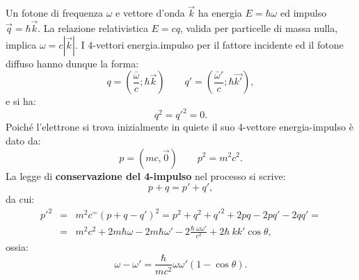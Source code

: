 \documentclass[a4paper,12pt,oneside]{book}
\begin{document}
Un fotone di frequenza $\omega$ e vettore d'onda $\vec{k}$ ha energia $E = \hbar \omega$ ed impulso $\vec{q}= \hbar \vec{k}$. La relazione relativistica $E=cq$, valida per particelle di massa nulla, implica $\omega = c|\vec{k}|$. I 4-vettori energia.impulso per il fattore incidente ed il fotone diffuso hanno dunque la forma:
\begin{equation}
q=\left(\frac{\bar \omega}{c}; \hbar \vec{k} \right)\qquad q' = \left(\frac{\bar \omega'}{c}; \hbar \vec{k'} \right),
\end{equation}
e si ha:
\begin{equation}
q^2 = q'^2=0.
\end{equation}
Poiché l'elettrone si trova inizialmente in quiete il suo 4-vettore energia-impulso è dato da:
\begin{equation}
p=\left(mc, \vec{0} \right)\qquad p^2 =m^2 c^2.
\end{equation}
La legge di \textbf{conservazione del 4-impulso} nel processo si scrive:
\begin{equation}
p+q=p'+q',
\end{equation}
da cui:
\begin{eqnarray}
p'^2 &=& m^2 c^ = \left( p +q -q'\right)^2= p^2 + q^2 +q'^2+ 2pq - 2pq' -2 qq'= \nonumber \\
&=& m^2c^2 + 2m\hbar \omega - 2m \hbar \omega ' - 2 \frac{\hbar \ \omega \omega '}{c^2}+2 \hbar \ k k'  \cos \theta ,
\end{eqnarray}
ossia:
\begin{equation}
\omega - \omega ' =\frac{\hbar}{m c^2} \omega \omega ' \left( 1-\cos \theta \right).
\label{eq:cap1_3}
\end{equation}
\end{document}

